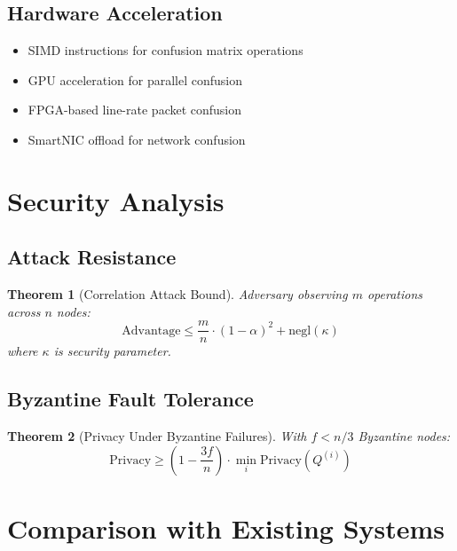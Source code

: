 \documentclass[11pt,final]{article}
\newtheorem{theorem}{Theorem}[section]
\begin{document}
\subsection{Hardware Acceleration}

\begin{itemize}
    \item SIMD instructions for confusion matrix operations
    \item GPU acceleration for parallel confusion
    \item FPGA-based line-rate packet confusion
    \item SmartNIC offload for network confusion
\end{itemize}

\section{Security Analysis}

\subsection{Attack Resistance}

\begin{theorem}[Correlation Attack Bound]
Adversary observing $m$ operations across $n$ nodes:
\begin{equation}
\text{Advantage} \leq \frac{m}{n} \cdot (1-\alpha)^2 + \text{negl}(\kappa)
\end{equation}
where $\kappa$ is security parameter.
\end{theorem}

\subsection{Byzantine Fault Tolerance}

\begin{theorem}[Privacy Under Byzantine Failures]
With $f < n/3$ Byzantine nodes:
\begin{equation}
\text{Privacy} \geq \left(1 - \frac{3f}{n}\right) \cdot \min_i \text{Privacy}(Q^{(i)})
\end{equation}
\end{theorem}

\section{Comparison with Existing Systems}
\end{document}
